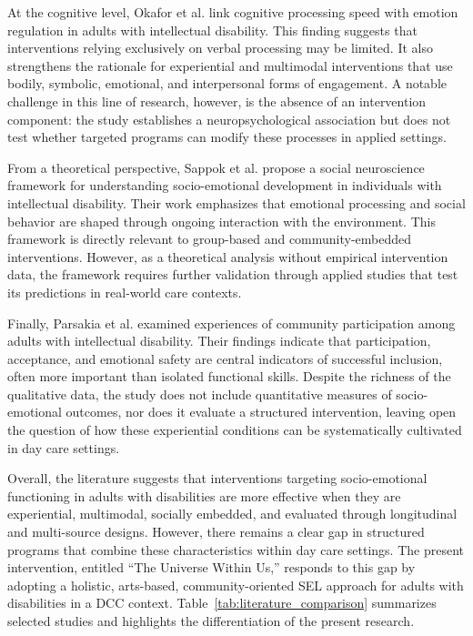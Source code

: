 \documentclass[journal]{IEEEtran}
\begin{document}
At the cognitive level, Okafor et al. \cite{okafor2025} link cognitive processing speed with emotion regulation in adults with intellectual disability. This finding suggests that interventions relying exclusively on verbal processing may be limited. It also strengthens the rationale for experiential and multimodal interventions that use bodily, symbolic, emotional, and interpersonal forms of engagement. A notable challenge in this line of research, however, is the absence of an intervention component: the study establishes a neuropsychological association but does not test whether targeted programs can modify these processes in applied settings.

From a theoretical perspective, Sappok et al. \cite{sappok2022} propose a social neuroscience framework for understanding socio-emotional development in individuals with intellectual disability. Their work emphasizes that emotional processing and social behavior are shaped through ongoing interaction with the environment. This framework is directly relevant to group-based and community-embedded interventions. However, as a theoretical analysis without empirical intervention data, the framework requires further validation through applied studies that test its predictions in real-world care contexts.

Finally, Parsakia et al. \cite{parsakia2024} examined experiences of community participation among adults with intellectual disability. Their findings indicate that participation, acceptance, and emotional safety are central indicators of successful inclusion, often more important than isolated functional skills. Despite the richness of the qualitative data, the study does not include quantitative measures of socio-emotional outcomes, nor does it evaluate a structured intervention, leaving open the question of how these experiential conditions can be systematically cultivated in day care settings.

Overall, the literature suggests that interventions targeting socio-emotional functioning in adults with disabilities are more effective when they are experiential, multimodal, socially embedded, and evaluated through longitudinal and multi-source designs. However, there remains a clear gap in structured programs that combine these characteristics within day care settings. The present intervention, entitled ``The Universe Within Us,'' responds to this gap by adopting a holistic, arts-based, community-oriented SEL approach for adults with disabilities in a DCC context.
Table~\ref{tab:literature_comparison} summarizes selected studies and highlights the differentiation of the present research.
\end{document}
